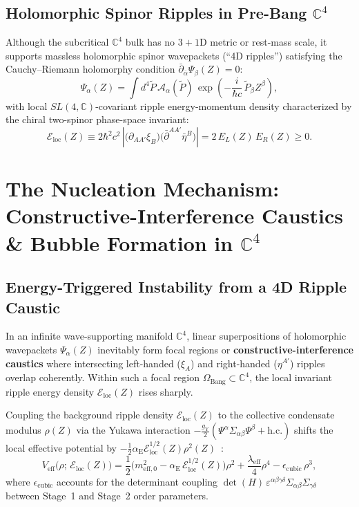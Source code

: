 \documentclass[11pt,a4paper]{article}
\begin{document}
\subsection{Holomorphic Spinor Ripples in Pre-Bang \texorpdfstring{$\mathbb{C}^4$}{C4}}
Although the subcritical $\mathbb{C}^4$ bulk has no $3+1\text{D}$ metric or rest-mass scale, it supports massless holomorphic spinor wavepackets (``4D ripples'') satisfying the Cauchy--Riemann holomorphy condition $\bar{\partial}_{\bar{\alpha}}\Psi_\beta(Z) = 0$:
\begin{equation}
\Psi_\alpha(Z) = \int d^4\tilde{P}\, \mathcal{A}_\alpha(\tilde{P})\, \exp\!\left( -\frac{i}{\hbar c}\, \tilde{P}_\beta Z^\beta \right),
\end{equation}
with local $SL(4,\mathbb{C})$-covariant ripple energy-momentum density characterized by the chiral two-spinor phase-space invariant:
\begin{equation}
\mathcal{E}_{\text{loc}}(Z) \equiv 2\hbar^2 c^2\, \left| \big(\partial_{AA'}\xi_B\big)\big(\bar{\partial}^{AA'}\bar{\eta}^B\big) \right| = 2\, E_L(Z)\, E_R(Z) \ge 0.
\end{equation}

\section{The Nucleation Mechanism: Constructive-Interference Caustics \& Bubble Formation in \texorpdfstring{$\mathbb{C}^4$}{C4}}

\subsection{Energy-Triggered Instability from a 4D Ripple Caustic}
In an infinite wave-supporting manifold $\mathbb{C}^4$, linear superpositions of holomorphic wavepackets $\Psi_\alpha(Z)$ inevitably form focal regions or \textbf{constructive-interference caustics} where intersecting left-handed ($\xi_A$) and right-handed ($\eta^{A'}$) ripples overlap coherently. Within such a focal region $\Omega_{\text{Bang}} \subset \mathbb{C}^4$, the local invariant ripple energy density $\mathcal{E}_{\text{loc}}(Z)$ rises sharply.

Coupling the background ripple density $\mathcal{E}_{\text{loc}}(Z)$ to the collective condensate modulus $\rho(Z)$ via the Yukawa interaction $-\frac{g_{\text{Y}}}{2}(\Psi^\alpha\Sigma_{\alpha\beta}\Psi^\beta + \text{h.c.})$ shifts the local effective potential by $-\frac{1}{2}\alpha_{\text{E}}\mathcal{E}_{\text{loc}}^{1/2}(Z)\rho^2(Z)$~\cite{NJL1961,ColemanWeinberg1973}:
\begin{equation}
V_{\text{eff}}\big(\rho;\, \mathcal{E}_{\text{loc}}(Z)\big) = \frac{1}{2}\Big( m_{\text{eff},0}^2 - \alpha_{\text{E}}\, \mathcal{E}_{\text{loc}}^{1/2}(Z) \Big)\rho^2 + \frac{\lambda_{\text{eff}}}{4}\rho^4 - \epsilon_{\text{cubic}}\, \rho^3,
\end{equation}
where $\epsilon_{\text{cubic}}$ accounts for the determinant coupling $\det(H)\,\varepsilon^{\alpha\beta\gamma\delta}\Sigma_{\alpha\beta}\Sigma_{\gamma\delta}$ between Stage~1 and Stage~2 order parameters.
\end{document}
